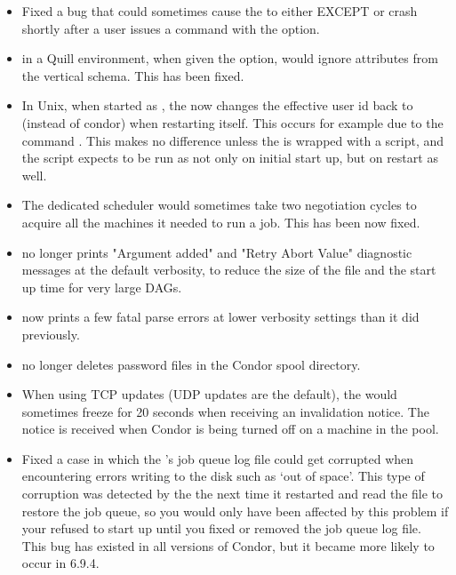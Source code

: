 \begin{itemize}
\item Fixed a bug that could sometimes cause the 
  to either EXCEPT or crash shortly after a user issues a 
  command with the  option.

\item {} in a Quill environment,
  when given the  option,
  would ignore attributes from the vertical schema.  This has been fixed.

\item In Unix, when started as ,
  the  now changes the
  effective user id back to  (instead of condor)
  when restarting itself.
  This occurs for example due to the command .
  This makes no difference unless the  is wrapped
  with a script, and the script expects to be run as 
  not only on initial start up, but on restart as well.

\item The dedicated scheduler would sometimes take two negotiation cycles
  to acquire all the machines it needed to run a job.
  This has been now fixed.

\item {} no longer prints "Argument added" and
  "Retry Abort Value" diagnostic messages at the default verbosity,
  to reduce the size of the  file and the start up time
  for very large DAGs.

\item {} now prints a few fatal parse errors at lower
  verbosity settings than it did previously.

\item {} no longer deletes  password files in the
  Condor spool directory.

\item When using TCP updates (UDP updates are the default), the
   would sometimes freeze for 20 seconds when
  receiving an invalidation notice.  
  The notice is received when Condor is being turned off
  on a machine in the pool.

\item Fixed a case in which the 's job queue log file
could get corrupted when encountering errors writing to the disk such
as `out of space'.  This type of corruption was detected by the
 the next time it restarted and read the file to
restore the job queue, so you would only have been affected by this
problem if your  refused to start up until you fixed or
removed the job queue log file.  This bug has existed in all versions
of Condor, but it became more likely to occur in 6.9.4.


\end{itemize}
